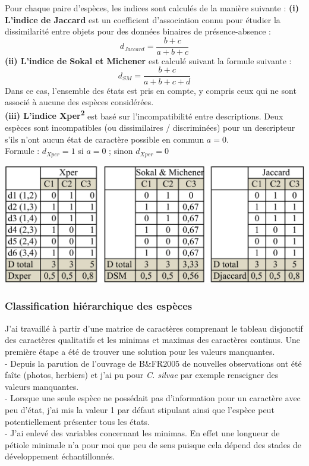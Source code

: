 \documentclass[a4paper]{article}
\theoremstyle{definition}
\theoremstyle{definition}
\theoremstyle{definition}
\theoremstyle{remark}
\begin{document}
Pour chaque paire d'espèces, les indices sont calculés de la manière
suivante : \textbf{(i) L'indice de Jaccard} est un coefficient
d'association connu pour étudier la dissimilarité entre objets pour des
données binaires de présence-absence : \[d_{Jaccard}=\frac{b+c}{a+b+c}\]
\textbf{(ii) L'indice de Sokal et Michener} est calculé suivant la
formule suivante : \[d_{SM}=\frac{b+c}{a+b+c+d}\] Dans ce cas,
l'ensemble des états est pris en compte, y compris ceux qui ne sont
associé à aucune des espèces considérées.\\
\textbf{(iii) L'indice Xper\textsuperscript{2}} est basé sur
l'incompatibilité entre descriptions. Deux espèces sont incompatibles
(ou dissimilaires / discriminées) pour un descripteur s'ils n'ont aucun
état de caractère possible en commun \(a = 0\).\\
Formule : \(d_{Xper} = 1\) si \(a = 0\) ; sinon \(d_{Xper} = 0\)

\begin{center}\includegraphics[width=1\linewidth]{figure/ex4} \end{center}

\subsubsection{Classification hiérarchique des
espèces}\label{classification-hierarchique-des-especes}

J'ai travaillé à partir d'une matrice de caractères comprenant le
tableau disjonctif des caractères qualitatifs et les minimas et maximas
des caractères continus. Une première étape a été de trouver une
solution pour les valeurs manquantes.\\
- Depuis la parution de l'ouvrage de B\&FR2005 de nouvelles observations
ont été faîte (photos, herbiers) et j'ai pu pour \emph{C. silvae} par
exemple renseigner des valeurs manquantes.\\
- Lorsque une seule espèce ne possédait pas d'information pour un
caractère avec peu d'état, j'ai mis la valeur 1 par défaut stipulant
ainsi que l'espèce peut potentiellement présenter tous les états.\\
- J'ai enlevé des variables concernant les minimas. En effet une
longueur de pétiole minimale n'a pour moi que peu de sens puisque cela
dépend des stades de développement échantillonnés.
\end{document}
